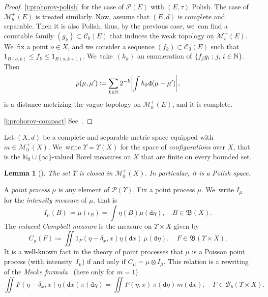 \documentclass[10pt]{amsart}
\newtheorem{lemma}[theorem]{Lemma}
\theoremstyle{definition}
\theoremstyle{remark}
\DeclarePairedDelimiter{\set}{\lbrace}{\rbrace}
\DeclarePairedDelimiter{\abs}{\lvert}{\rvert}
\begin{document}
\skpt
\begin{proof}
\cref{i:prohorov-polish} \cite[Th.\,6.2, 6.5, \& 6.6]{Parthasarathy} for the case of $\mathscr{P}(E)$ with $(E,\tau)$ Polish.
The case of $\mathscr{M}_{b}^{+}(E)$ is treated similarly.
Now, assume that $(E,d)$ is complete and separable.
Then it is also Polish, thus, by the previous case, we~can find a countable family $(g_{k}) \subset \mathscr{C}_{b}(E)$ that induces the weak topology on $\mathscr{M}^{+}_{b}(E)$. We~fix a point $o \in X$, and we consider a sequence $(f_{k}) \subset \mathscr{C}_{0}(E)$ such that $1_{B(o,k)} \leq f_{k} \leq 1_{B(o,k+1)}$. We~take~$(h_{k})$ an enumeration of $\set{ f_{j} g_{i} : j,\, i \in \mathbb{N} }$.
Then
\begin{equation*}
\rho(\mu, \mu') \coloneq \sum_{k \in \mathbb{N}} 2^{-k} \abs*{ \int h_{k} \mathtt{d} (\mu - \mu') },
\end{equation*}
is a distance metrizing the vague topology on $\mathscr{M}_{0}^{+}(E)$, and it is complete.

\cref{i:prohorov-compact} See~\cite[Th.\,8.6.2]{Bogachev}.
\end{proof}

Let $(X, d)$ be a complete and separable metric space equipped with $m \in \mathscr{M}_{0}^{+}(X)$. We~write $\varUpsilon = \varUpsilon(X)$ for the space of \emph{configurations} over $X$, that is the $\mathbb{N}_{0} \cup \{\infty\}$-valued Borel measures on $X$ that are finite on every bounded set.

\begin{lemma}[{\eg \cite[Lem.\,2.1]{GHP}}]\label{t:config-locally-compact}
The set $\varUpsilon$ is closed in $\mathscr{M}_{0}^{+}(X)$. In particular, it is a Polish space.
\end{lemma}

A \emph{point process} $\mu$ is any element of $\mathscr{P}(\varUpsilon)$.
Fix a point process $\mu$. We~write $I_{\mu}$ for the \emph{intensity measure} of $\mu$, that is
\begin{equation*}
I_{\mu}(B) \coloneq \mu(\iota_{B}) = \int \eta(B) \mu(\mathtt{d} \eta), \quad B \in \mathfrak{B}(X).
\end{equation*}
The \emph{reduced Campbell measure} is the measure on $\varUpsilon \times X$ given by
\begin{equation*}
C_{\mu}(F) \coloneq \iint 1_{F}(\eta - \delta_{x}, x) \eta(\mathtt{d} x)\, \mu(\mathtt{d} \eta), \quad F \in \mathfrak{B}(\varUpsilon \times X).
\end{equation*}
It is a well-known fact in the theory of point processes that $\mu$ is a Poisson point process (with intensity~$I_{\mu}$) if and only if $C_{\mu} = \mu \otimes I_{\mu}$.
This relation is a rewriting of the \emph{Mecke formula}~\cite[Th.\,4.5]{LastPenrose} (here only for $m =1$)
\begin{equation}\label{eq:Mecke2}
\iint F(\eta - \delta_{x}, x) \eta(\mathtt{d} x) \pi(\mathtt{d}\eta) = \iint F(\eta,x)\, \pi(\mathtt{d} \eta)\, m(\mathtt{d} x), \quad F \in \mathscr{B}_{b}(\varUpsilon \times X).
\end{equation}
\end{document}
